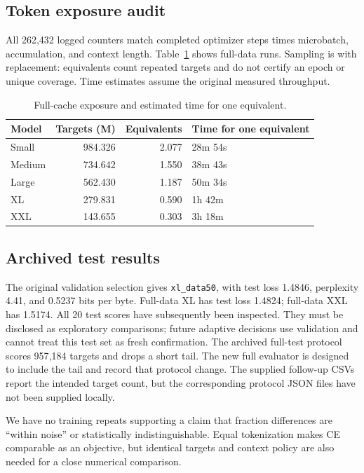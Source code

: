 \documentclass[12pt]{article}
\begin{document}
\subsection{Token exposure audit}
All 262{,}432 logged counters match completed optimizer steps times microbatch,
accumulation, and context length. Table~\ref{tab:exposure} shows full-data runs.
Sampling is with replacement: equivalents count repeated targets and do not certify
an epoch or unique coverage. Time estimates assume the original measured throughput.

\begin{table}[htbp]
\centering
\caption{Full-cache exposure and estimated time for one equivalent.}
\label{tab:exposure}
\begin{tabular}{lrrl}
\toprule
Model & Targets (M) & Equivalents & Time for one equivalent \\
\midrule
Small & 984.326 & 2.077 & 28m 54s \\
Medium & 734.642 & 1.550 & 38m 43s \\
Large & 562.430 & 1.187 & 50m 34s \\
XL & 279.831 & 0.590 & 1h 42m \\
XXL & 143.655 & 0.303 & 3h 18m \\
\bottomrule
\end{tabular}
\end{table}

\subsection{Archived test results}\label{sec:test}
The original validation selection gives \texttt{xl\_data50}, with test loss 1.4846,
perplexity 4.41, and 0.5237 bits per byte. Full-data XL has test loss 1.4824;
full-data XXL has 1.5174. All 20 test scores have subsequently been inspected.
They must be disclosed as exploratory comparisons; future adaptive decisions use
validation and cannot treat this test set as fresh confirmation. The archived
full-test protocol scores 957{,}184 targets and drops a short tail. The new full
evaluator is designed to include the tail and record that protocol change. The
supplied follow-up CSVs report the intended target count, but the corresponding
protocol JSON files have not been supplied locally.

We have no training repeats supporting a claim that fraction differences are
``within noise'' or statistically indistinguishable. Equal tokenization makes CE
comparable as an objective, but identical targets and context policy are also needed
for a close numerical comparison.
\end{document}
